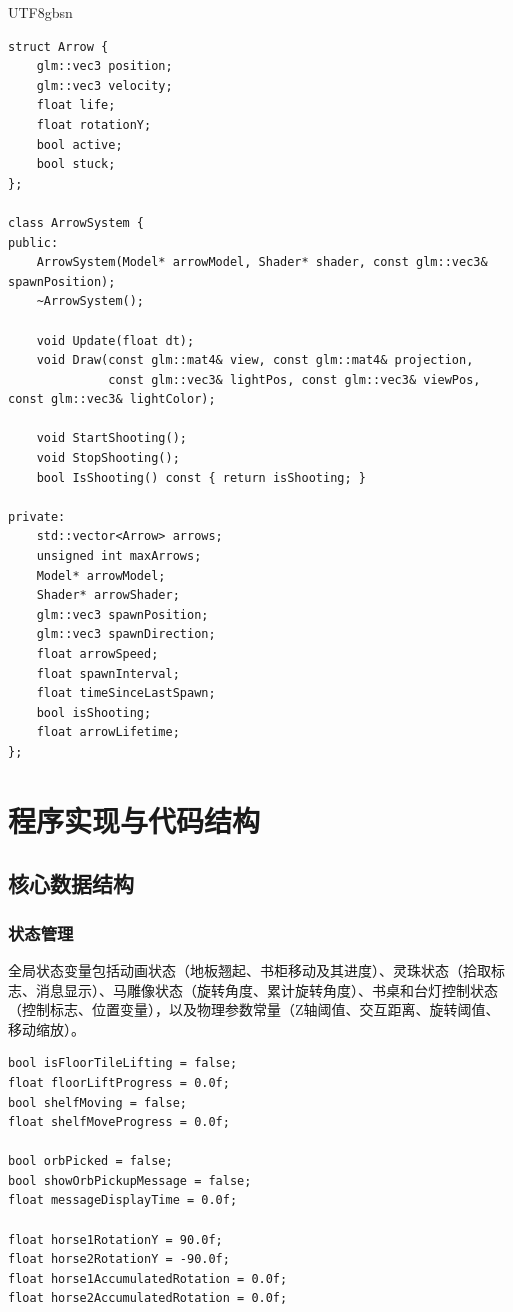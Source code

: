 \documentclass{article}
\begin{document}
\begin{CJK}{UTF8}{gbsn}
\begin{lstlisting}[caption=Arrow结构体与ArrowSystem类]
struct Arrow {
    glm::vec3 position;
    glm::vec3 velocity;
    float life;
    float rotationY;
    bool active;
    bool stuck;
};

class ArrowSystem {
public:
    ArrowSystem(Model* arrowModel, Shader* shader, const glm::vec3& spawnPosition);
    ~ArrowSystem();
    
    void Update(float dt);
    void Draw(const glm::mat4& view, const glm::mat4& projection, 
              const glm::vec3& lightPos, const glm::vec3& viewPos, const glm::vec3& lightColor);
    
    void StartShooting();
    void StopShooting();
    bool IsShooting() const { return isShooting; }
    
private:
    std::vector<Arrow> arrows;
    unsigned int maxArrows;
    Model* arrowModel;
    Shader* arrowShader;
    glm::vec3 spawnPosition;
    glm::vec3 spawnDirection;
    float arrowSpeed;
    float spawnInterval;
    float timeSinceLastSpawn;
    bool isShooting;
    float arrowLifetime;
};
\end{lstlisting}

\section{程序实现与代码结构}

\subsection{核心数据结构}

\subsubsection{状态管理}
全局状态变量包括动画状态（地板翘起、书柜移动及其进度）、灵珠状态（拾取标志、消息显示）、马雕像状态（旋转角度、累计旋转角度）、书桌和台灯控制状态（控制标志、位置变量），以及物理参数常量（Z轴阈值、交互距离、旋转阈值、移动缩放）。

\begin{lstlisting}[caption=全局状态变量]
bool isFloorTileLifting = false;
float floorLiftProgress = 0.0f;
bool shelfMoving = false;
float shelfMoveProgress = 0.0f;

bool orbPicked = false;
bool showOrbPickupMessage = false;
float messageDisplayTime = 0.0f;

float horse1RotationY = 90.0f;
float horse2RotationY = -90.0f;
float horse1AccumulatedRotation = 0.0f;
float horse2AccumulatedRotation = 0.0f;


\end{lstlisting}
\end{CJK}
\end{document}
